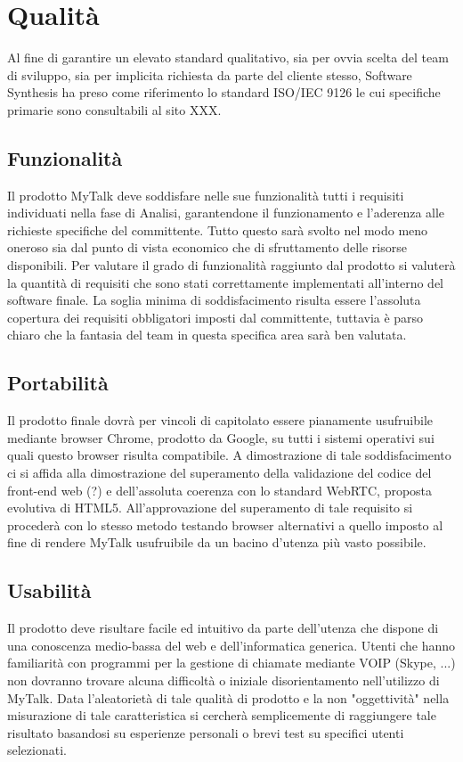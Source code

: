 \section{Qualità}
Al fine di garantire un elevato standard qualitativo, sia per ovvia scelta del team di sviluppo, sia per implicita richiesta da parte del cliente stesso, Software Synthesis ha preso come riferimento lo standard ISO/IEC 9126 le cui specifiche primarie sono consultabili al sito XXX.
 
\subsection{Funzionalità}
Il prodotto MyTalk deve soddisfare nelle sue funzionalità tutti i requisiti individuati nella fase di Analisi, garantendone il funzionamento e l'aderenza alle richieste specifiche del committente. Tutto questo sarà svolto nel modo meno oneroso sia dal punto di vista economico che di sfruttamento delle risorse disponibili.
Per valutare il grado di funzionalità raggiunto dal prodotto si valuterà la quantità di requisiti che sono stati correttamente implementati all'interno del software finale. La soglia minima di soddisfacimento risulta essere l'assoluta copertura dei requisiti obbligatori imposti dal committente, tuttavia è parso chiaro che la fantasia del team in questa specifica area sarà ben valutata.

\subsection{Portabilità}
Il prodotto finale dovrà per vincoli di capitolato essere pianamente usufruibile mediante browser Chrome, prodotto da Google, su tutti i sistemi operativi sui quali questo browser risulta compatibile. 
A dimostrazione di tale soddisfacimento ci si affida alla dimostrazione del superamento della validazione del codice del front-end web (?) e dell'assoluta coerenza con lo standard WebRTC, proposta evolutiva di HTML5.
All'approvazione del superamento di tale requisito si procederà con lo stesso metodo testando browser alternativi a quello imposto al fine di rendere MyTalk usufruibile da un bacino d'utenza più vasto possibile.
\subsection{Usabilità}
Il prodotto deve risultare facile ed intuitivo da parte dell'utenza che dispone di una conoscenza medio-bassa del web e dell'informatica generica.
Utenti che hanno familiarità con programmi per la gestione di chiamate mediante VOIP (Skype, ...) non dovranno trovare alcuna difficoltà o iniziale disorientamento nell'utilizzo di MyTalk.
Data l'aleatorietà di tale qualità di prodotto e la non "oggettività" nella misurazione di tale caratteristica si cercherà semplicemente di raggiungere tale risultato basandosi su esperienze personali o brevi test su specifici utenti selezionati.
